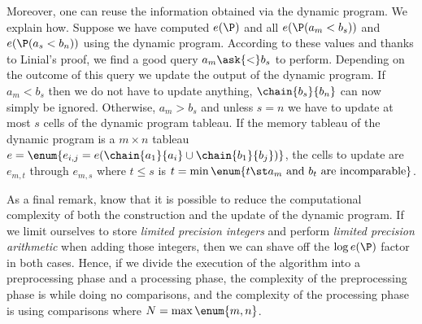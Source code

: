 Moreover, one can reuse the information obtained via the dynamic program. We
explain how. Suppose we have computed \(e(\P)\) and all \(e(\P(a_m < b_s))\) and
\(e(\P(a_s < b_n))\) using the dynamic program. According to these values and
thanks to Linial's proof, we find a good query \(a_m \ask{<} b_s\) to perform.
Depending on the outcome of this query we update the output of the dynamic
program. If \(a_m < b_s\) then we do not have to update anything,
\(\chain{b_s}{b_n}\) can now simply be ignored. Otherwise, \(a_m > b_s\) and
unless \(s = n\) we have to update at most \(s\) cells of the dynamic program
tableau. If the memory tableau of the dynamic program is a \(m \times n\)
tableau \(e = \enum{e_{i,j} = e(\chain{a_1}{a_i} \cup \chain{b_1}{b_j})}\), the
cells to update are \(e_{m,t}\) through \(e_{m,s}\) where \(t \le s\) is \( t =
\min \enum{t \st a_m \text{ and } b_t \text{ are incomparable} }\).

As a final remark, know that it is possible to reduce the computational
complexity of both the construction and the update of the dynamic program. If
we limit ourselves to store \emph{limited precision integers} and perform
\emph{limited precision arithmetic} when adding those integers, then we can
shave off the \(\log e(\P)\) factor in both cases. Hence, if we divide the
execution of the algorithm into a preprocessing phase and a processing phase,
the complexity of the preprocessing phase is  while doing no
comparisons, and the complexity of the processing phase is 
using  comparisons where \(N = \max \enum{m,n}\).
